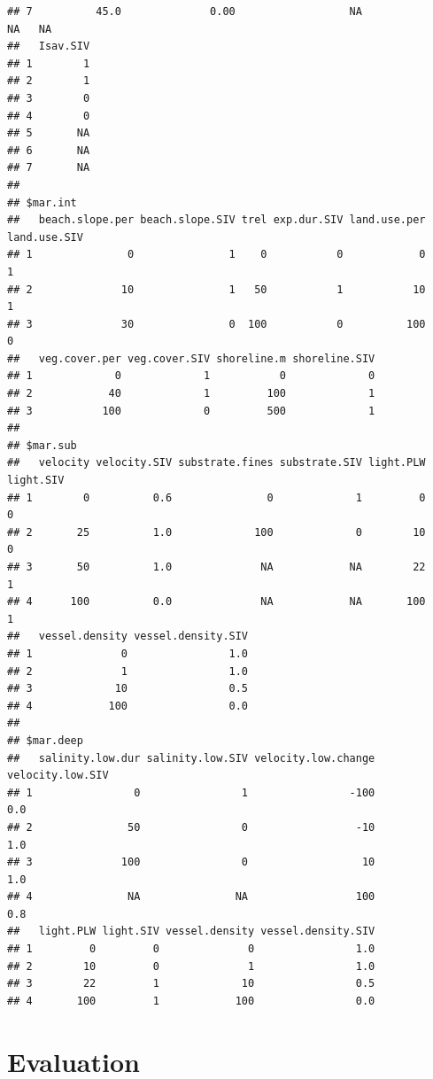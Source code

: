 \documentclass[
]{book}
\begin{document}
\begin{verbatim}
## 7          45.0              0.00                  NA                 NA   NA
##   Isav.SIV
## 1        1
## 2        1
## 3        0
## 4        0
## 5       NA
## 6       NA
## 7       NA
## 
## $mar.int
##   beach.slope.per beach.slope.SIV trel exp.dur.SIV land.use.per land.use.SIV
## 1               0               1    0           0            0            1
## 2              10               1   50           1           10            1
## 3              30               0  100           0          100            0
##   veg.cover.per veg.cover.SIV shoreline.m shoreline.SIV
## 1             0             1           0             0
## 2            40             1         100             1
## 3           100             0         500             1
## 
## $mar.sub
##   velocity velocity.SIV substrate.fines substrate.SIV light.PLW light.SIV
## 1        0          0.6               0             1         0         0
## 2       25          1.0             100             0        10         0
## 3       50          1.0              NA            NA        22         1
## 4      100          0.0              NA            NA       100         1
##   vessel.density vessel.density.SIV
## 1              0                1.0
## 2              1                1.0
## 3             10                0.5
## 4            100                0.0
## 
## $mar.deep
##   salinity.low.dur salinity.low.SIV velocity.low.change velocity.low.SIV
## 1                0                1                -100              0.0
## 2               50                0                 -10              1.0
## 3              100                0                  10              1.0
## 4               NA               NA                 100              0.8
##   light.PLW light.SIV vessel.density vessel.density.SIV
## 1         0         0              0                1.0
## 2        10         0              1                1.0
## 3        22         1             10                0.5
## 4       100         1            100                0.0
\end{verbatim}

\hypertarget{evaluation}{%
\chapter{Evaluation}\label{evaluation}}
\end{document}
